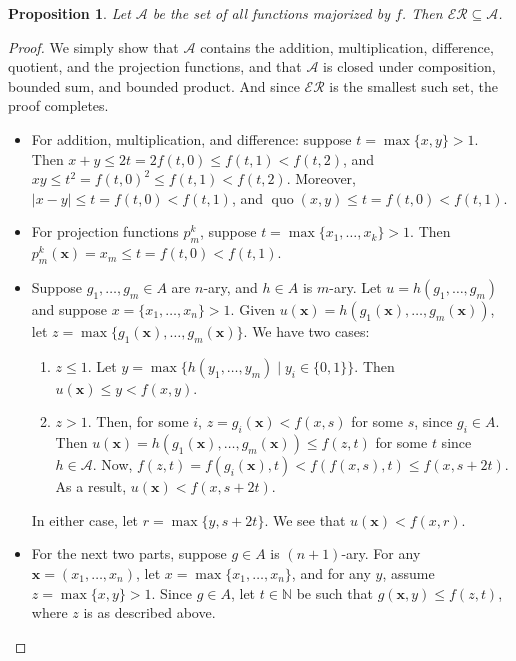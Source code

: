 \documentclass[12pt]{article}
\newtheorem{prop}{Proposition}
\begin{document}
\begin{prop} Let $\mathcal{A}$ be the set of all functions majorized by $f$.  Then $\mathcal{ER}\subseteq \mathcal{A}$.\end{prop}
\begin{proof}  We simply show that $\mathcal{A}$ contains the addition, multiplication, difference, quotient, and the projection functions, and that $\mathcal{A}$ is closed under composition, bounded sum, and bounded product.  And since $\mathcal{ER}$ is the smallest such set, the proof completes.
\begin{itemize}
\item For addition, multiplication, and difference: suppose $t = \max\lbrace x,y\rbrace >1$.  Then $x+y \le 2t =2f(t,0)\le f(t,1)<f(t,2)$, and $xy \le t^2 = f(t,0)^2 \le f(t,1)<f(t,2)$.  Moreover, $|x-y| \le t = f(t,0)<f(t,1)$, and $\operatorname{quo}(x,y) \le t = f(t,0)<f(t,1)$.
\item For projection functions $p_m^k$, suppose $t=\max \lbrace x_1,\ldots, x_k\rbrace>1$.  Then $p_m^k(\boldsymbol{x}) =x_m \le t = f(t,0)<f(t,1)$.
\item Suppose $g_1,\ldots, g_m\in A$ are $n$-ary, and $h\in A$ is $m$-ary.  Let $u=h(g_1,\ldots, g_m)$ and suppose $x=\lbrace x_1, \ldots, x_n\rbrace >1$.  Given $u(\boldsymbol{x}) = h(g_1(\boldsymbol{x}),\ldots, g_m(\boldsymbol{x}))$, let $z= \max \lbrace g_1(\boldsymbol{x}),\ldots, g_m(\boldsymbol{x}) \rbrace$.  We have two cases:
\begin{enumerate}
\item $z\le 1$.  Let $y=\max \lbrace h(y_1,\ldots,y_m) \mid y_i \in \lbrace 0,1\rbrace \rbrace$.  Then $u(\boldsymbol{x}) \le y < f(x,y)$.
\item $z>1$.  Then, for some $i$, $z= g_i(\boldsymbol{x})< f(x,s)$ for some $s$, since $g_i\in A$.  Then $u(\boldsymbol{x}) = h(g_1(\boldsymbol{x}),\ldots, g_m(\boldsymbol{x})) \le f(z,t)$ for some $t$ since $h\in \mathcal{A}$.  Now, $f(z,t)= f(g_i(\boldsymbol{x}),t) < f(f(x,s),t)\le f(x,s+2t)$.  As a result, $u(\boldsymbol{x})< f(x,s+2t)$.
\end{enumerate}
In either case, let $r=\max\lbrace y,s+2t\rbrace$.  We see that $u(\boldsymbol{x})< f(x,r)$.
\item For the next two parts, suppose $g\in A$ is $(n+1)$-ary.  For any $\boldsymbol{x}=(x_1,\ldots, x_n)$, let $x=\max \lbrace x_1,\ldots, x_n \rbrace$, and for any $y$, assume $z=\max \lbrace x, y\rbrace>1$.  Since $g\in A$, let $t\in \mathbb{N}$ be such that $g(\boldsymbol{x},y) \le f(z,t)$, where $z$ is as described above.


\end{itemize}
\end{proof}
\end{document}

